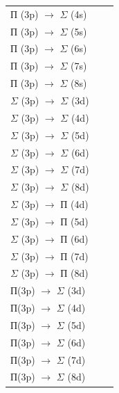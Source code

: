 \begin{flushleft}
\begin{supertabular}{|m{2.4360003cm}|m{2.3630004cm}|m{2.584cm}|}
 &
\raggedleft{}\\\hline
{П (3p) $\rightarrow $ $\Sigma $ (4s)} &
 &
\raggedleft{}\\
{П (3p) $\rightarrow $ $\Sigma $ (5s)} &
 &
\raggedleft{}\\
{П (3p) $\rightarrow $ $\Sigma $ (6s)} &
 &
\raggedleft{}\\
{П (3p) $\rightarrow $ $\Sigma $ (7s)} &
 &
\raggedleft{}\\
{П (3p) $\rightarrow $ $\Sigma $ (8s)} &
 &
\raggedleft{}\\\hline
{$\Sigma $ (3p) $\rightarrow $ $\Sigma $ (3d)} &
 &
\raggedleft{}\\
{$\Sigma $ (3p) $\rightarrow $ $\Sigma $ (4d)} &
 &
\raggedleft{}\\
{$\Sigma $ (3p) $\rightarrow $ $\Sigma $ (5d)} &
 &
\raggedleft{}\\
{$\Sigma $ (3p) $\rightarrow $ $\Sigma $ (6d)} &
 &
\raggedleft{}\\
{$\Sigma $ (3p) $\rightarrow $ $\Sigma $ (7d)} &
 &
\raggedleft{}\\
{$\Sigma $ (3p) $\rightarrow $ $\Sigma $ (8d)} &
 &
\raggedleft{}\\\hline
{$\Sigma $ (3p) $\rightarrow $ П (4d)} &
 &
\raggedleft{}\\
{$\Sigma $ (3p) $\rightarrow $ П (5d)} &
 &
\raggedleft{}\\
{$\Sigma $ (3p) $\rightarrow $ П (6d)} &
 &
\raggedleft{}\\
{$\Sigma $ (3p) $\rightarrow $ П (7d)} &
 &
\raggedleft{}\\
{$\Sigma $ (3p) $\rightarrow $ П (8d)} &
 &
\raggedleft{}\\\hline
{П(3p) $\rightarrow $ $\Sigma $ (3d)} &
 &
\raggedleft{}\\
{П(3p) $\rightarrow $ $\Sigma $ (4d)} &
 &
\raggedleft{}\\
{П(3p) $\rightarrow $ $\Sigma $ (5d)} &
 &
\raggedleft{}\\
{П(3p) $\rightarrow $ $\Sigma $ (6d)} &
 &
\raggedleft{}\\
{П(3p) $\rightarrow $ $\Sigma $ (7d)} &
 &
\raggedleft{}\\
{П(3p) $\rightarrow $ $\Sigma $ (8d)} &
 &
\raggedleft{}\\\hline
\end{supertabular}
\end{flushleft}


